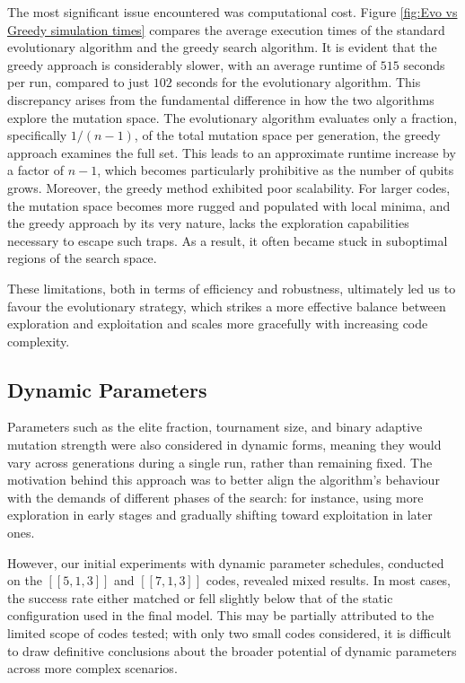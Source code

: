 The most significant issue encountered was computational cost. Figure \ref{fig:Evo vs Greedy simulation times} compares the average execution times of the standard evolutionary algorithm and the greedy search algorithm. It is evident that the greedy approach is considerably slower, with an average runtime of \(515\) seconds per run, compared to just \(102\) seconds for the evolutionary algorithm. This discrepancy arises from the fundamental difference in how the two algorithms explore the mutation space. The evolutionary algorithm evaluates only a fraction, specifically \(1/(n-1)\), of the total mutation space per generation, the greedy approach examines the full set. This leads to an approximate runtime increase by a factor of \(n-1\), which becomes particularly prohibitive as the number of qubits grows. Moreover, the greedy method exhibited poor scalability. For larger codes, the mutation space becomes more rugged and populated with local minima, and the greedy approach by its very nature, lacks the exploration capabilities necessary to escape such traps. As a result, it often became stuck in suboptimal regions of the search space.

These limitations, both in terms of efficiency and robustness, ultimately led us to favour the evolutionary strategy, which strikes a more effective balance between exploration and exploitation and scales more gracefully with increasing code complexity.

\subsection{Dynamic Parameters}
Parameters such as the elite fraction, tournament size, and binary adaptive mutation strength were also considered in dynamic forms, meaning they would vary across generations during a single run, rather than remaining fixed. The motivation behind this approach was to better align the algorithm's behaviour with the demands of different phases of the search: for instance, using more exploration in early stages and gradually shifting toward exploitation in later ones.

However, our initial experiments with dynamic parameter schedules, conducted on the \([[5,1,3]]\) and \([[7,1,3]]\) codes, revealed mixed results. In most cases, the success rate either matched or fell slightly below that of the static configuration used in the final model. This may be partially attributed to the limited scope of codes tested; with only two small codes considered, it is difficult to draw definitive conclusions about the broader potential of dynamic parameters across more complex scenarios.


